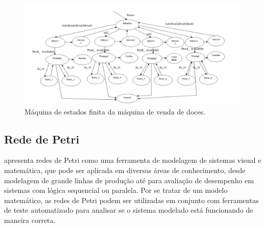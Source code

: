 \begin{figure}[ht]
    \centering
    \includegraphics[width=\textwidth, keepaspectratio]{resources/snackmachine.png}
    \caption{Máquina de estados finita da máquina de venda de doces. \cite{snack}}
    \label{fig:snack}
\end{figure}

 \newpage





\subsection{Rede de Petri}
\label{def:petri_prop}
 apresenta redes de Petri como uma ferramenta de modelagem de sistemas visual e matemática, que pode ser aplicada em diversas áreas de conhecimento, desde modelagem de grande linhas de produção até para avaliação de desempenho em sistemas com lógica sequencial ou paralela. Por se tratar de um modelo matemático, as redes de Petri podem ser utilizadas em conjunto com ferramentas de teste automatizado para analisar se o sistema modelado está funcionando de maneira correta.


